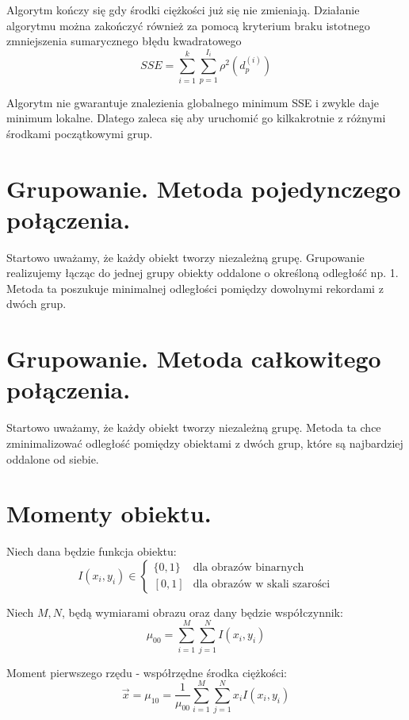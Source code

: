 \documentclass[a4paper,10pt]{article}
\begin{document}
Algorytm kończy się gdy środki ciężkości już się nie zmieniają.
Działanie algorytmu można zakończyć również za pomocą kryterium braku istotnego zmniejszenia sumarycznego błędu kwadratowego 
\begin{equation}
SSE = \sum_{i=1}^{k} \sum_{p=1}^{I_i}\rho^2 (d_p^{(i)})
\end{equation}

Algorytm nie gwarantuje znalezienia globalnego minimum SSE i zwykle daje minimum lokalne. Dlatego zaleca się aby uruchomić go kilkakrotnie z różnymi środkami początkowymi grup.

\section{Grupowanie. Metoda pojedynczego połączenia.}
Startowo uważamy, że każdy obiekt tworzy niezależną grupę.
Grupowanie realizujemy łącząc do jednej grupy obiekty oddalone o określoną odległość np. 1.
Metoda ta poszukuje minimalnej odległości pomiędzy dowolnymi rekordami z dwóch grup.

\section{Grupowanie. Metoda całkowitego połączenia.}
Startowo uważamy, że każdy obiekt tworzy niezależną grupę.
Metoda ta chce zminimalizować odległość pomiędzy obiektami z dwóch grup, które są najbardziej oddalone od siebie.

\section{Momenty obiektu.}
Niech dana będzie funkcja obiektu:
\begin{equation}
 I(x_i, y_i) \in 
\begin{cases}
 \{0, 1\} & \mbox{dla obrazów binarnych}\\
 \left[0, 1\right] & \mbox{dla obrazów w skali szarości}
\end{cases}
\end{equation}

Niech $M, N$, będą wymiarami obrazu oraz dany będzie współczynnik:
\begin{equation}
  \mu_{00} = \sum_{i=1}^{M} \sum_{j=1}^{N} I(x_i, y_i)
\end{equation}

Moment pierwszego rzędu - współrzędne środka ciężkości:
\begin{equation}
  \overrightarrow{x} = \mu_{10} = \frac{1}{\mu_{00}} \sum_{i=1}^{M} \sum_{j=1}^{N} x_i I(x_i, y_i)
\end{equation}
\end{document}
